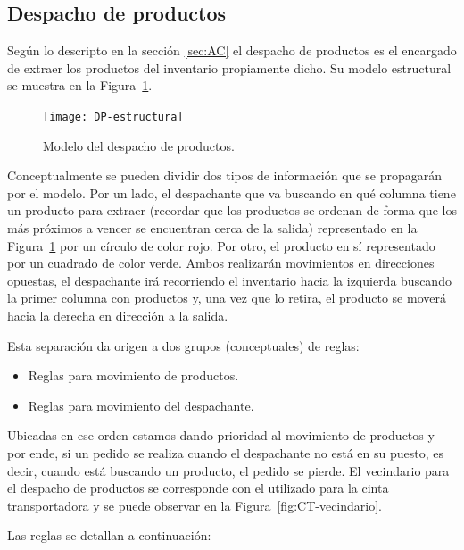\documentclass[10pt]{article}
\begin{document}
\subsection{Despacho de productos}\label{sec:DP}
Según lo descripto en la sección \ref{sec:AC} el despacho de productos es el encargado de extraer los productos del inventario propiamente dicho.
Su modelo estructural se muestra en la Figura~\ref{fig:DP-estructura}.

\begin{figure}[h] 
	\centering 
	\texttt{[image: DP-estructura]} 
	\caption{Modelo del despacho de productos.} 
	\label{fig:DP-estructura} 
\end{figure}

Conceptualmente se pueden dividir dos tipos de información que se propagarán por el modelo. Por un lado, el despachante que va buscando en qué columna tiene un producto para extraer (recordar que los productos se ordenan de forma que los más próximos a vencer se encuentran cerca de la salida) representado en la Figura~\ref{fig:DP-estructura} por un círculo de color rojo. Por otro, el producto en sí representado por un cuadrado de color verde. Ambos realizarán movimientos en direcciones opuestas, el despachante irá recorriendo el inventario hacia la izquierda buscando la primer columna con productos y, una vez que lo retira, el producto se moverá hacia la derecha en dirección a la salida.

Esta separación da origen a dos grupos (conceptuales) de reglas:
\begin{itemize}
	\item Reglas para movimiento de productos.
	\item Reglas para movimiento del despachante.
\end{itemize}

Ubicadas en ese orden estamos dando prioridad al movimiento de productos y por ende, si un pedido se realiza cuando el despachante no está en su puesto, es decir, cuando está buscando un producto, el pedido se pierde. El vecindario para el despacho de productos se corresponde con el utilizado para la cinta transportadora y se puede observar en la Figura~\ref{fig:CT-vecindario}. 

Las reglas se detallan a continuación:
\end{document}
